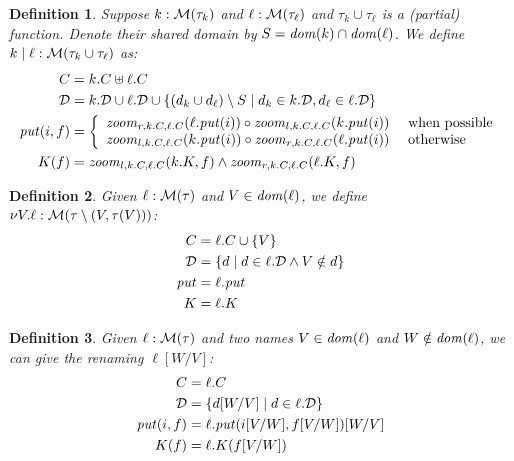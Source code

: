 \documentclass{article}
\newtheorem{definition}{Definition}
\begin{document}
\begin{definition}
    Suppose $k : \mathcal M(\tau_k)$ and $\ell : \mathcal M(\tau_\ell)$ and
    $\tau_k\cup\tau_\ell$ is a (partial) function. Denote their shared
    domain by $S=\mathit{dom}(k) \cap \mathit{dom}(\ell)$. We define $k\mid\ell :
    \mathcal M(\tau_k\cup\tau_\ell)$ as:
    \begin{align*}
        C &= k.C \uplus \ell.C \\
        \mathcal D &= k.\mathcal D \cup \ell.\mathcal D \cup
            \{(d_k \cup d_\ell) \setminus S
            \mid d_k \in k.\mathcal D, d_\ell \in \ell.\mathcal D\} \\
        \mathit{put}(i,f) &= \left\{\begin{array}{ll}
            \mathit{zoom}_{r,k.C,\ell.C}(\ell.\mathit{put}(i)) \circ \mathit{zoom}_{l,k.C,\ell.C}(k.\mathit{put}(i))
                & \mbox{ when possible} \\
            \mathit{zoom}_{l,k.C,\ell.C}(k.\mathit{put}(i)) \circ \mathit{zoom}_{r,k.C,\ell.C}(\ell.\mathit{put}(i))
                & \mbox{ otherwise}
            \end{array}\right. \\
        K(f) &= \mathit{zoom}_{l,k.C,\ell.C}(k.K,f) \land \mathit{zoom}_{r,k.C,\ell.C}(\ell.K,f)
    \end{align*}
\end{definition}

\begin{definition}
    Given $\ell : \mathcal M(\tau)$ and $V \in \mathit{dom}(\ell)$, we define $\nu
    V.\ell : \mathcal M(\tau \setminus (V,\tau(V)))$:
    \begin{align*}
        C &= \ell.C \cup \{V\} \\
        \mathcal D &= \{d \mid d \in \ell.\mathcal D \land V \notin d\} \\
        \mathit{put} &= \ell.\mathit{put} \\
        K &= \ell.K
    \end{align*}
\end{definition}

\begin{definition}
    Given $\ell : \mathcal M(\tau)$ and two names $V \in \mathit{dom}(\ell)$ and $W
    \notin \mathit{dom}(\ell)$, we can give the renaming $\ell[W/V]$:
    \begin{align*}
        C &= \ell.C \\
        \mathcal D &= \{d[W/V] \mid d \in \ell.\mathcal D\} \\
        \mathit{put}(i,f) &= \ell.\mathit{put}(i[V/W], f[V/W])[W/V] \\
        K(f) &= \ell.K(f[V/W])
    \end{align*}
\end{definition}
\end{document}
